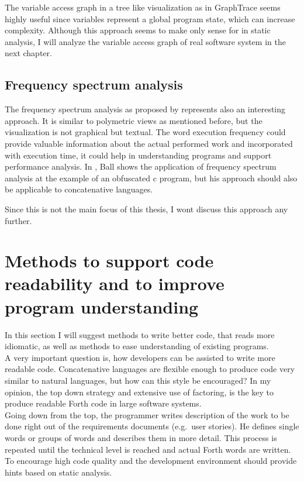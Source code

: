 The variable access graph in a tree like visualization as in GraphTrace seems highly useful since variables represent a global program state, which can increase complexity. Although this approach seems to make only sense for in static analysis, I will analyze the variable access graph of real software system in the next chapter.

\subsection*{Frequency spectrum analysis}

The frequency spectrum analysis as proposed by \cite{Ball:1999:CDA:318774.318944} represents also an interesting approach. It is similar to polymetric views as mentioned before, but the visualization is not graphical but textual. The word execution frequency could provide valuable information about the actual performed work and incorporated with execution time, it could help in understanding programs and support performance analysis. In \cite{Ball:1999:CDA:318774.318944}, Ball shows the application of frequency spectrum analysis at the example of an obfuscated c program, but his approach should also be applicable to concatenative languages.

Since this is not the main focus of this thesis, I wont discuss this approach any further.

\section{Methods to support code readability and to improve program understanding}

In this section I will suggest methods to write better code, that reads more idiomatic, as well as methods to ease understanding of existing programs.
\\
A very important question is, how developers can be assisted to write more readable code. Concatenative languages are flexible enough to produce code very similar to natural languages, but how can this style be encouraged? In my opinion, the top down strategy and extensive use of factoring, is the key to produce readable Forth code in large software systems.
\\
Going down from the top, the programmer writes description of the work to be done right out of the requirements documents (e.g.\ user stories). He defines single words or groups of words and describes them in more detail. This process is repeated until the technical level is reached and actual Forth words are written.
\\
To encourage high code quality and the development environment should provide hints based on static analysis.

